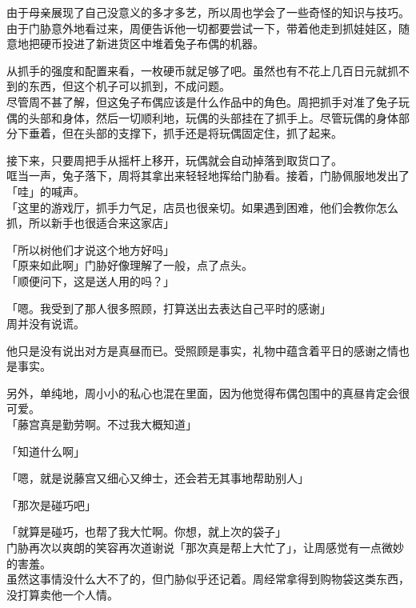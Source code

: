 由于母亲展现了自己没意义的多才多艺，所以周也学会了一些奇怪的知识与技巧。\\

由于门胁意外地看过来，周便告诉他一切都要尝试一下，带着他走到抓娃娃区，随意地把硬币投进了新进货区中堆着兔子布偶的机器。

从抓手的强度和配置来看，一枚硬币就足够了吧。虽然也有不花上几百日元就抓不到的东西，但这个机子可以抓到，不成问题。\\

尽管周不甚了解，但这兔子布偶应该是什么作品中的角色。周把抓手对准了兔子玩偶的头部和身体，然后一切顺利地，玩偶的头部挂在了抓手上。尽管玩偶的身体部分下垂着，但在头部的支撑下，抓手还是将玩偶固定住，抓了起来。

接下来，只要周把手从摇杆上移开，玩偶就会自动掉落到取货口了。\\

哐当一声，兔子落下，周将其拿出来轻轻地挥给门胁看。接着，门胁佩服地发出了「哇」的喊声。\\

「这里的游戏厅，抓手力气足，店员也很亲切。如果遇到困难，他们会教你怎么抓，所以新手也很适合来这家店」

「所以树他们才说这个地方好吗」\\

「原来如此啊」门胁好像理解了一般，点了点头。\\

「顺便问下，这是送人用的吗？」

「嗯。我受到了那人很多照顾，打算送出去表达自己平时的感谢」\\

周并没有说谎。

他只是没有说出对方是真昼而已。受照顾是事实，礼物中蕴含着平日的感谢之情也是事实。

另外，单纯地，周小小的私心也混在里面，因为他觉得布偶包围中的真昼肯定会很可爱。\\

「藤宫真是勤劳啊。不过我大概知道」

「知道什么啊」

「嗯，就是说藤宫又细心又绅士，还会若无其事地帮助别人」

「那次是碰巧吧」

「就算是碰巧，也帮了我大忙啊。你想，就上次的袋子」\\

门胁再次以爽朗的笑容再次道谢说「那次真是帮上大忙了」，让周感觉有一点微妙的害羞。\\

虽然这事情没什么大不了的，但门胁似乎还记着。周经常拿得到购物袋这类东西，没打算卖他一个人情。\\

